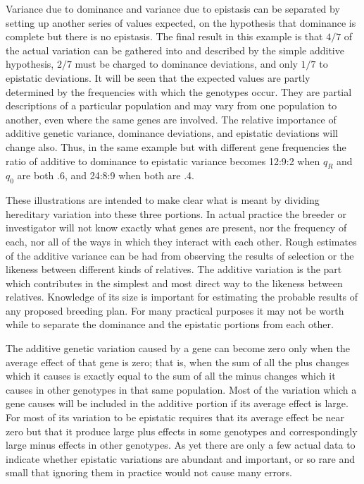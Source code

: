 {
Variance due to dominance and variance due to epistasis can be
separated by setting up another series of values expected, on the hypothesis
that dominance is complete but there is no epistasis. The final
result in this example is that $4/7$ of the actual variation can be gathered
into and described by the simple additive hypothesis, $2/7$ must be
charged to dominance deviations, and only $1/7$ to epistatic deviations.
It will be seen that the expected values are partly determined by the
frequencies with which the genotypes occur. They are partial descriptions
of a particular population and may vary from one population to
another, even where the same genes are involved. The relative importance
of additive genetic variance, dominance deviations, and epistatic
deviations will change also. Thus, in the same example but with different
gene frequencies the ratio of additive to dominance to epistatic
variance becomes 12:9:2 when $q_R$ and $q_0$ are both .6, and 24:8:9 when
both are .4.

These illustrations are intended to make clear what is meant by
dividing hereditary variation into these three portions. In actual practice
the breeder or investigator will not know exactly what genes are
present, nor the frequency of each, nor all of the ways in which they
interact with each other. Rough estimates of the additive variance can
be had from observing the results of selection or the likeness between
different kinds of relatives. The additive variation is the part which
contributes in the simplest and most direct way to the likeness between
relatives. Knowledge of its size is important for estimating the probable
results of any proposed breeding plan. For many practical purposes it
may not be worth while to separate the dominance and the epistatic
portions from each other.

The additive genetic variation caused by a gene can become zero
only when the average effect of that gene is zero; that is, when the sum
of all the plus changes which it causes is exactly equal to the sum of all
the minus changes which it causes in other genotypes in that same
population. Most of the variation which a gene causes will be included
in the additive portion if its average effect is large. For most of its variation
to be epistatic requires that its average effect be near zero but that
it produce large plus effects in some genotypes and correspondingly
large minus effects in other genotypes. As yet there are only a few actual
data to indicate whether epistatic variations are abundant and important,
or so rare and small that ignoring them in practice would not
cause many errors.

}
